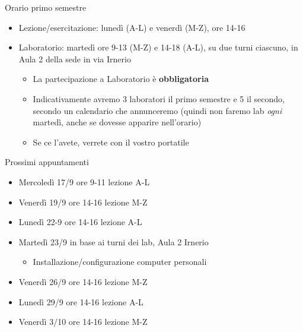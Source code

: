 \begin{frame}{Orario primo semestre}
  \begin{itemize}
  \item Lezione/esercitazione: lunedì (A-L) e venerdì (M-Z), ore 14-16
  \item Laboratorio: martedì ore 9-13 (M-Z) e 14-18 (A-L), su due
    turni ciascuno, in Aula 2 della sede in via Irnerio
    \begin{itemize}
    \item La partecipazione a Laboratorio è \textbf{obbligatoria}
    \item Indicativamente avremo 3 laboratori il primo semestre e 5 il secondo,
      secondo un calendario che annunceremo (quindi non faremo lab \textit{ogni}
      martedì, anche se dovesse apparire nell'orario)
    \item Se ce l'avete, verrete con il vostro portatile
    \end{itemize}
  \end{itemize}
\end{frame}

\begin{frame}{Prossimi appuntamenti}
  \begin{itemize}

  \item Mercoledì 17/9 ore 9-11 lezione A-L
  \item Venerdì 19/9 ore 14-16 lezione M-Z
  \item Lunedì 22-9 ore 14-16 lezione A-L
  \item Martedì 23/9 in base ai turni dei lab, Aula 2 Irnerio
    \begin{itemize}
    \item Installazione/configurazione computer personali
    \end{itemize}
  \item Venerdì 26/9 ore 14-16 lezione M-Z
  \item Lunedì 29/9 ore 14-16 lezione A-L
  \item Venerdì 3/10 ore 14-16 lezione M-Z
  \end{itemize}
\end{frame}

